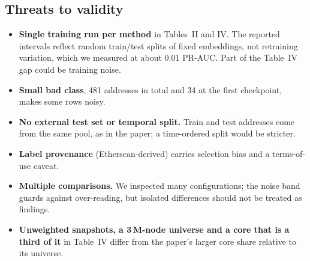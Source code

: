 \subsection{Threats to validity}
\begin{itemize}
\item \textbf{Single training run per method} in Tables~II and IV. The reported intervals reflect random train/test splits of fixed embeddings, not retraining variation, which we measured at about 0.01 PR-AUC. Part of the Table~IV gap could be training noise.
\item \textbf{Small bad class}, 481 addresses in total and 34 at the first checkpoint, makes some rows noisy.
\item \textbf{No external test set or temporal split.} Train and test addresses come from the same pool, as in the paper; a time-ordered split would be stricter.
\item \textbf{Label provenance} (Etherscan-derived) carries selection bias and a terms-of-use caveat.
\item \textbf{Multiple comparisons.} We inspected many configurations; the noise band guards against over-reading, but isolated differences should not be treated as findings.
\item \textbf{Unweighted snapshots, a 3\,M-node universe and a core that is a third of it} in Table~IV differ from the paper's larger core share relative to its universe.
\end{itemize}

